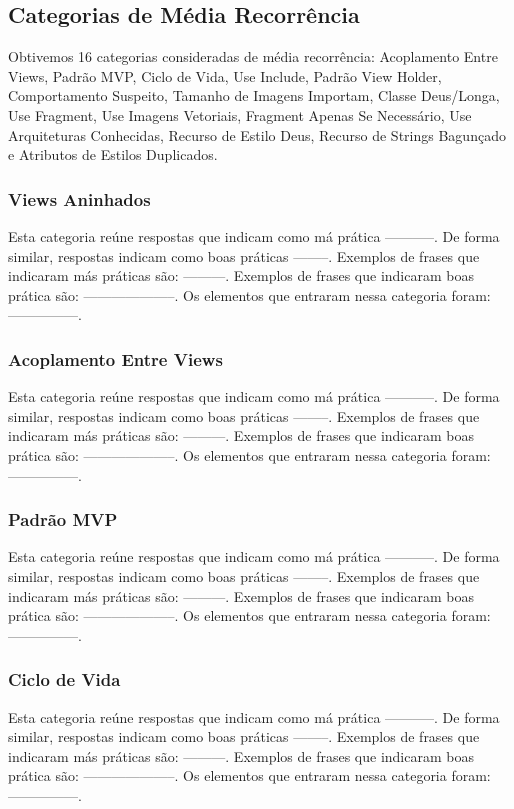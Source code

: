 \subsection{Categorias de M\'edia Recorr\^encia}
Obtivemos 16 categorias consideradas de m\'edia recorr\^encia: Acoplamento Entre Views, Padr\~ao MVP, Ciclo de Vida, Use Include, Padr\~ao View Holder, Comportamento Suspeito, Tamanho de Imagens Importam, Classe Deus/Longa, Use Fragment, Use Imagens Vetoriais, Fragment Apenas Se Necess\'ario, Use Arquiteturas Conhecidas, Recurso de Estilo Deus, Recurso de Strings Bagun\c{c}ado e Atributos de Estilos Duplicados.


\subsubsection{Views Aninhados}
Esta categoria re\'une respostas que indicam como m\'a pr\'atica -----------. De forma similar, respostas indicam como boas pr\'aticas --------. Exemplos de frases que indicaram m\'as pr\'aticas s\~ao: ---------. Exemplos de frases que indicaram boas pr\'atica s\~ao: --------------------. Os elementos que entraram nessa categoria foram: ---------------. 


\subsubsection{Acoplamento Entre Views}
Esta categoria re\'une respostas que indicam como m\'a pr\'atica -----------. De forma similar, respostas indicam como boas pr\'aticas --------. Exemplos de frases que indicaram m\'as pr\'aticas s\~ao: ---------. Exemplos de frases que indicaram boas pr\'atica s\~ao: --------------------. Os elementos que entraram nessa categoria foram: ---------------. 


\subsubsection{Padrão MVP}
Esta categoria re\'une respostas que indicam como m\'a pr\'atica -----------. De forma similar, respostas indicam como boas pr\'aticas --------. Exemplos de frases que indicaram m\'as pr\'aticas s\~ao: ---------. Exemplos de frases que indicaram boas pr\'atica s\~ao: --------------------. Os elementos que entraram nessa categoria foram: ---------------. 

\subsubsection{Ciclo de Vida}
Esta categoria re\'une respostas que indicam como m\'a pr\'atica -----------. De forma similar, respostas indicam como boas pr\'aticas --------. Exemplos de frases que indicaram m\'as pr\'aticas s\~ao: ---------. Exemplos de frases que indicaram boas pr\'atica s\~ao: --------------------. Os elementos que entraram nessa categoria foram: ---------------. 

